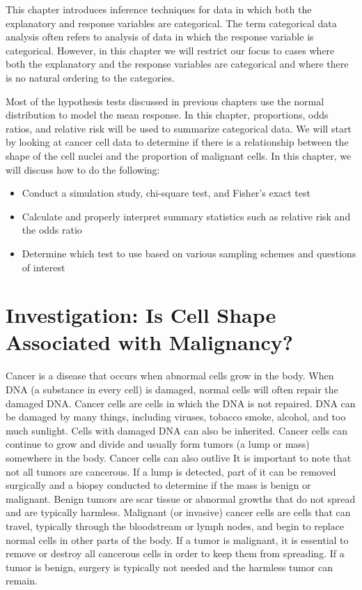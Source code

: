\documentclass[
]{report}
\providecommand{\tightlist}{%
  \setlength{\itemsep}{0pt}\setlength{\parskip}{0pt}}
\begin{document}
This chapter introduces inference techniques for data in which both the explanatory and
response variables are categorical. The term categorical data analysis often refers to
analysis of data in which the response variable is categorical. However, in this chapter
we will restrict our focus to cases where both the explanatory and the response variables are
categorical and where there is no natural ordering to the categories.

Most of the hypothesis tests discussed in previous chapters use the normal distribution to
model the mean response. In this chapter, proportions, odds ratios, and relative risk will be
used to summarize categorical data. We will start by looking at cancer cell data to determine
if there is a relationship between the shape of the cell nuclei and the proportion of malignant
cells. In this chapter, we will discuss how to do the following:

\begin{itemize}
\tightlist
\item
  Conduct a simulation study, chi-square test, and Fisher's exact test
\item
  Calculate and properly interpret summary statistics such as relative risk and the odds ratio
\item
  Determine which test to use based on various sampling schemes and questions of interest
\end{itemize}

\section{\texorpdfstring{\textbf{Investigation: Is Cell Shape Associated with Malignancy?}}{Investigation: Is Cell Shape Associated with Malignancy?}}\label{investigation-is-cell-shape-associated-with-malignancy}

Cancer is a disease that occurs when abnormal cells grow in the body. When DNA (a substance in every
cell) is damaged, normal cells will often repair the damaged DNA. Cancer cells are cells in which the
DNA is not repaired. DNA can be damaged by many things, including viruses, tobacco smoke, alcohol,
and too much sunlight. Cells with damaged DNA can also be inherited. Cancer cells can continue to grow
and divide and usually form tumors (a lump or mass) somewhere in the body. Cancer cells can also outlive
It is important to note that not all tumors are cancerous. If a lump is detected, part of it can be removed
surgically and a biopsy conducted to determine if the mass is benign or malignant. Benign tumors are scar
tissue or abnormal growths that do not spread and are typically harmless. Malignant (or invasive) cancer
cells are cells that can travel, typically through the bloodstream or lymph nodes, and begin to replace normal
cells in other parts of the body. If a tumor is malignant, it is essential to remove or destroy all cancerous cells
in order to keep them from spreading. If a tumor is benign, surgery is typically not needed and the harmless
tumor can remain.
\end{document}
